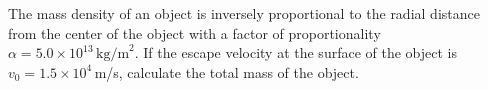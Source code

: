 The mass density of an object is inversely proportional to the radial distance
from the center of the object with a factor of proportionality
$\alpha = 5.0 \times 10^{13}\,\mathrm{kg/m}^2$. If the escape velocity at the
surface of the object is $v_0 = 1.5 \times 10^4$\,m/s, calculate the total
mass of the object.
